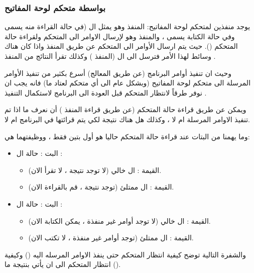 \documentclass[document.tex]{subfiles}
\begin{document}
\subsubsection{بواسطة متحكم لوحة المفاتيح}
يوجد منفذين لمتحكم لوحة المفاتيح: المنفذ  وهو يمثل ال  (في حالة القراءة منه يسمى  وفي حالة الكتابة يسمى ، والمنفذ  وهو لإرسال الاوامر الى المتحكم ولقراءة حالة المتحكم (). حيث يتم ارسال الأوامر الى المتحكم عن طريق المنفذ  واذا كان هناك وسائط لهذا الأمر فترسل الى ال  (المنفذ ) وكذلك تقرأ النتائج من المنفذ .

وحيث ان تنفيذ أوامر البرنامج (عن طريق المعالج) أسرع بكثير من تنفيذ الأوامر المرسلة الى متحكم لوحة المفاتيح (وبشكل عام الى أي متحكم لعتاد ما)  فانه يجب ان نوفر طرقاً لانتظار المتحكم قبل العودة الى البرنامج لاستكمال التنفيذ .

ويمكن عن طريق قراءة حالة المتحكم (عن طريق قراءة المنفذ ) أن نعرف ما اذا تم تنفيذ الاوامر المرسلة ام لا ، وكذلك هل هناك نتيجة لكي يتم قرائتها في البرنامج ام لا.

وما يهمنا من البتات عند قراءة حالة المتحكم حاليا هو أول بتين فقط  ، ووظيفتهما هي:

\begin{itemize}
\item البت : حالة ال :
\begin{itemize}
\item القيمة : ال  خالي (لا توجد نتيجة ، لا تقرأ الان).
\item القيمة : ال  ممتلئ (توجد نتيجة ، قم بالقراءة الان).
\end{itemize}

\item البت : حالة ال :
\begin{itemize}
\item القيمة : ال  خالي (لا توجد أوامر غير منفذة ، يمكن الكتابة الان).
\item القيمة : ال  ممتلئ (توجد أوامر غير منفذة ، لا تكتب الان).
\end{itemize}

\end{itemize}

والشفرة التالية توضح كيفية انتظار المتحكم حتى ينفذ الاوامر المرسله اليه () وكيفية انتظار المتحكم الى ان يأتي بنتيجة ما ().

\begin{english}
\lstset{numberstyle=\tiny,numbers=left,stepnumber=1,numbersep=5pt,tabsize=2,extendedchars=true,breaklines=true,frame=b,showspaces=false, showtabs=false,xleftmargin=10pt,framexleftmargin=10pt,framexrightmargin=5pt,framexbottommargin=4pt,showstringspaces=false,language=[x86masm]Assembler}


\end{english}
\end{document}
